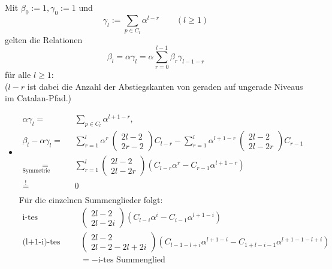 \documentclass[a4paper, 11pt]{scrreprt}
\begin{document}
Mit \(\beta_0 :=1, \gamma_0:=1 \) und
\begin{equation*}
		\gamma_l:=\sum_{p\in C_l} \alpha^{l-r} \qquad (l\geq 1)
\end{equation*}
gelten die Relationen
\begin{equation}
	\beta_l = \alpha\gamma_l=\alpha\sum_{r=0}^{l-1}\beta_r \gamma_{l-1-r}
\end{equation}
für alle \(l\geq 1\):\\
(\(l-r\) ist dabei die Anzahl der Abstiegskanten von geraden auf ungerade Niveaus im Catalan-Pfad.)
\begin{itemize}
	\item \begin{equation}
	\begin{split}
\alpha \gamma_{l} =& \sum_{p \in C_l} \alpha^{l+1-r},\\
\beta_l - \alpha \gamma_l =& \sum_{r=1}^{l} \alpha^r\ \begin{pmatrix} 2l-2\\2r-2\end{pmatrix} C_{l-r} - \sum_{r=1}^{l} \alpha^{l+1-r}\ \begin{pmatrix} 2l-2\\2l-2r\end{pmatrix} C_{r-1}   \\ 
\underset{\text{Symmetrie Binom.}}{=}& \sum_{r=1}^{l} \begin{pmatrix} 2l-2\\2l-2r\end{pmatrix} \left( C_{l-r} \alpha^r - C_{r-1}\alpha^{l+1-r} \right) \\
\overset{!}{=}& 0 \\
\end{split}
\end{equation}
Für die einzelnen Summenglieder folgt:
\begin{align*}
\text{i-tes Summenglied:} &\begin{pmatrix} 2l-2\\2l-2i\end{pmatrix} \left( C_{l-i} \alpha^i - C_{i-1}\alpha^{l+1-i} \right) \\
\text{(l+1-i)-tes Summenglied:}& \begin{pmatrix} 2l-2\\2l-2-2l+2i\end{pmatrix} \left( C_{l-1-l+i} \alpha^{l+1-i} - C_{1+l-i-1}\alpha^{l+1-1-l+i} \right)\\
 &= - \text{i-tes Summenglied}  

\end{align*}
\end{itemize}
\end{document}
